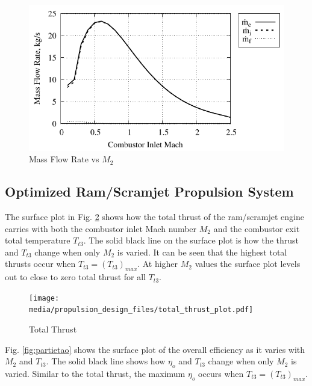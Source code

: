 \documentclass[conf]{new-aiaa} %
\begin{document}
\begin{figure}[H] %
    \centering
    \includegraphics[]{media/performance_parameter_files/part_h_mass.pdf}
    \caption{\label{fig:parthmass}Mass Flow Rate vs \texorpdfstring{\textit{$M_2$}}{M2}}
\end{figure}

\subsection{Optimized Ram/Scramjet Propulsion System} %
The surface plot in Fig. \ref{fig:partithrust} shows how the total thrust of the ram/scramjet engine carries with both the combustor inlet Mach number $M_2$ and the combustor exit total temperature $T_{t3}$. The solid black line on the surface plot is how the thrust and $T_{t3}$ change when only $M_2$ is varied. It can be seen that the highest total thrusts occur when $T_{t3}=(T_{t3})_{max}$. At higher $M_2$ values the surface plot levels out to close to zero total thrust for all $T_{t3}$.

\begin{figure}[H] %
    \centering
    \texttt{[image: media/propulsion\_design\_files/total\_thrust\_plot.pdf]}
    \caption{\label{fig:partithrust}Total Thrust}
\end{figure}
Fig. \ref{fig:partietao} shows the surface plot of the overall efficiency as it varies with $M_2$ and $T_{t3}$. The solid black line shows how $\eta_o$ and $T_{t3}$ change when only $M_2$ is varied. Similar to the total thrust, the maximum $\eta_o$ occurs when $T_{t3}=(T_{t3})_{max}$.
\end{document}
